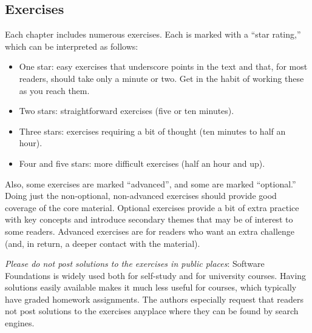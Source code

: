 \documentclass[12pt]{report}
\begin{document}
\subsection{Exercises}



 Each chapter includes numerous exercises.  Each is marked with a
    ``star rating,'' which can be interpreted as follows:



\begin{itemize}
\item  One star: easy exercises that underscore points in the text
         and that, for most readers, should take only a minute or two.
         Get in the habit of working these as you reach them.



\item  Two stars: straightforward exercises (five or ten minutes).



\item  Three stars: exercises requiring a bit of thought (ten
         minutes to half an hour).



\item  Four and five stars: more difficult exercises (half an hour
         and up).

\end{itemize}


    Also, some exercises are marked ``advanced'', and some are marked
    ``optional.''  Doing just the non-optional, non-advanced exercises
    should provide good coverage of the core material.  Optional
    exercises provide a bit of extra practice with key concepts and
    introduce secondary themes that may be of interest to some
    readers.  Advanced exercises are for readers who want an extra
    challenge (and, in return, a deeper contact with the material).


    \textit{Please do not post solutions to the exercises in public places}:
    Software Foundations is widely used both for self-study and for
    university courses.  Having solutions easily available makes it
    much less useful for courses, which typically have graded homework
    assignments.  The authors especially request that readers not post
    solutions to the exercises anyplace where they can be found by
    search engines.
\begin{coqdoccode}
\coqdocemptyline
\end{coqdoccode}
\end{document}
